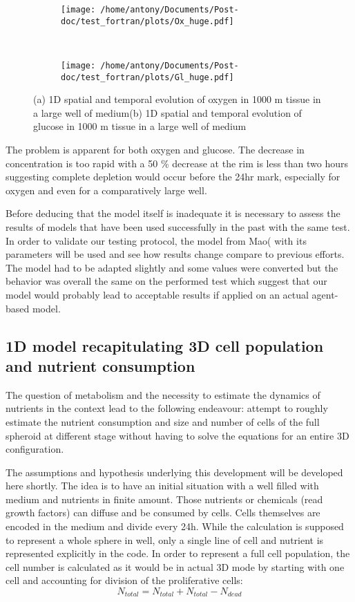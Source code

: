 \documentclass[11pt,a4paper]{article}
\begin{document}
\begin{figure}[ht!]
	\begin{subfigure}{0.5\textwidth}
	\centering
	\texttt{[image: /home/antony/Documents/Post-doc/test\_fortran/plots/Ox\_huge.pdf]}
	\caption{ \label{Ox_bal}}
	\end{subfigure}
	~~
	\begin{subfigure}{0.5\textwidth}
	\texttt{[image: /home/antony/Documents/Post-doc/test\_fortran/plots/Gl\_huge.pdf]}
		\caption{ \label{Gl_bal}}
	\end{subfigure}
	\caption{(a) 1D spatial and temporal evolution of oxygen in 1000 \textmu m tissue in a large well of medium(b) 1D spatial and temporal evolution of glucose in 1000 \textmu m tissue in a large well of medium}
\end{figure}

The problem is apparent for both oxygen and glucose. The decrease in concentration is too rapid with a 50 \% decrease at the rim is less than two hours suggesting complete depletion would occur before the 24hr mark, especially for oxygen and even for a comparatively large well.

Before deducing that the model itself is inadequate it is necessary to assess the results of models that have been used successfully in the past with the same test. In order to validate our testing protocol, the model from Mao(\cite{Mao2018} with its parameters will be used and see how results change compare to previous efforts. The model had to be adapted slightly and some values were converted but the behavior was overall the same on the performed test which suggest that our model would probably lead to acceptable results if applied on an actual agent-based model.

\subsection{1D model recapitulating 3D cell population and nutrient consumption}
The question of metabolism and the necessity to estimate the dynamics of nutrients in the context lead to the following endeavour: attempt to roughly estimate the nutrient consumption and size and number of cells of the full spheroid at different stage without having to solve the equations for an entire 3D configuration.

The assumptions and hypothesis underlying this development will be developed here shortly. The idea is to have an initial situation with a well filled with medium and nutrients in finite amount. Those nutrients or chemicals (read growth factors) can diffuse and be consumed by cells. Cells themselves are encoded in the medium and divide every 24h. While the calculation is supposed to represent a whole sphere in well, only a single line of cell and nutrient is represented explicitly in the code. In order to represent a full cell population, the cell number is calculated as it would be in actual 3D mode by starting with one cell and accounting for division of the proliferative cells: 
\[N_{total} = N_{total} + N_{total} - N_{dead}\]
\end{document}
